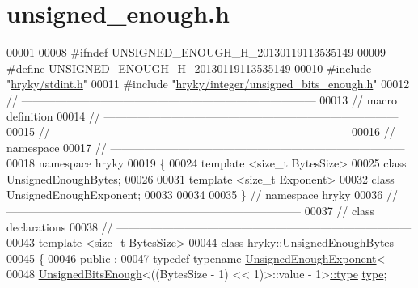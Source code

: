 \hypertarget{unsigned__enough_8h_source}{\section{unsigned\-\_\-enough.\-h}
}

\begin{DoxyCode}
00001 
00008 \textcolor{preprocessor}{#ifndef UNSIGNED\_ENOUGH\_H\_20130119113535149}
00009 \textcolor{preprocessor}{}\textcolor{preprocessor}{#define UNSIGNED\_ENOUGH\_H\_20130119113535149}
00010 \textcolor{preprocessor}{}\textcolor{preprocessor}{#include "\hyperlink{stdint_8h}{hryky/stdint.h}"}
00011 \textcolor{preprocessor}{#include "\hyperlink{unsigned__bits__enough_8h}{hryky/integer/unsigned_bits_enough.h}"}
00012 \textcolor{comment}{//
      ------------------------------------------------------------------------------}
00013 \textcolor{comment}{// macro definition}
00014 \textcolor{comment}{//
      ------------------------------------------------------------------------------}
00015 \textcolor{comment}{//
      ------------------------------------------------------------------------------}
00016 \textcolor{comment}{// namespace}
00017 \textcolor{comment}{//
      ------------------------------------------------------------------------------}
00018 \textcolor{keyword}{namespace }hryky
00019 \{
00024     \textcolor{keyword}{template} <\textcolor{keywordtype}{size\_t} BytesSize>
00025     \textcolor{keyword}{class }UnsignedEnoughBytes;
00026 
00031     \textcolor{keyword}{template} <\textcolor{keywordtype}{size\_t} Exponent>
00032     \textcolor{keyword}{class }UnsignedEnoughExponent;
00033     
00034 
00035 \} \textcolor{comment}{// namespace hryky}
00036 \textcolor{comment}{//
      ------------------------------------------------------------------------------}
00037 \textcolor{comment}{// class declarations}
00038 \textcolor{comment}{//
      ------------------------------------------------------------------------------}
00043 \textcolor{comment}{}\textcolor{keyword}{template} <\textcolor{keywordtype}{size\_t} BytesSize>
\hypertarget{unsigned__enough_8h_source_l00044}{}\hyperlink{classhryky_1_1_unsigned_enough_bytes}{00044} \textcolor{keyword}{class }\hyperlink{classhryky_1_1_unsigned_enough_bytes}{hryky::UnsignedEnoughBytes}
00045 \{
00046 \textcolor{keyword}{public} :
00047     \textcolor{keyword}{typedef} \textcolor{keyword}{typename} \hyperlink{classhryky_1_1_unsigned_enough_exponent}{UnsignedEnoughExponent}<
00048         \hyperlink{classhryky_1_1_unsigned_bits_enough}{UnsignedBitsEnough}<((BytesSize - 1) << 1)>::value - 1>\hyperlink{classhryky_1_1_unsigned_enough_exponent}{::type} \hyperlink{classhryky_1_1_unsigned_enough_exponent}{type};

\end{DoxyCode}
